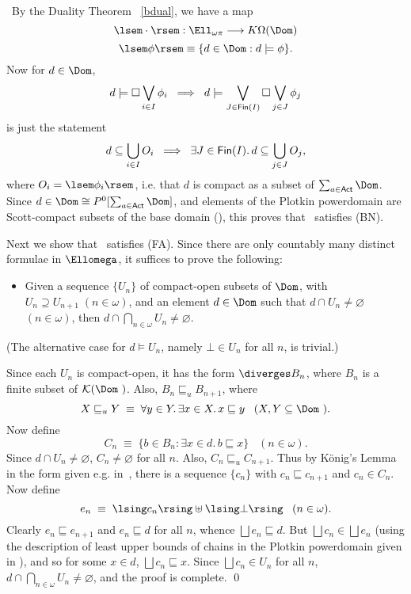 \proof\ By the Duality Theorem~ \ref{bdual}, we have a map
\[ \lsem \cdot \rsem : \Ell_{\omega \pi} \longrightarrow K \Omega (\Dom ) \]
\[ \lsem \phi \rsem  \equiv  \{ d \in \Dom : d \models \phi \} . \]
Now for $d \in \Dom$,
\[ d \models \Box \bigvee_{i \in I} \phi_{i}  \;\; \Longrightarrow \;\; d \models \bigvee_{J \in {\sf Fin}(I)} \Box \bigvee_{j \in J} \phi_{j}  \]
is just the statement
\[ d \subseteq \bigcup_{i \in I} O_{i} \;\; \Longrightarrow \;\; \exists J \in {\sf Fin}(I) . \, d \subseteq \bigcup_{j \in J} O_{j} , \]
where $O_{i} = \lsem \phi_{i} \rsem$, i.e. that $d$ is compact as a subset of $\sum_{a \in {\sf Act}} \Dom$.
Since $d \in \Dom \cong P^{0} [ \sum_{a \in {\sf Act}} \Dom ]$, and elements of the Plotkin powerdomain are Scott-compact subsets of the base domain (\cite{PloLN}), this proves that \Dom\ satisfies (BN).

Next we show that \Dom\ satisfies (FA).
Since there are only countably many distinct formulae in $\Ellomega$, it suffices to prove the following:
\begin{itemize}
\item Given a sequence $\{ U_{n} \}$ of compact-open subsets of $\Dom$, 
with $U_{n} \supseteq U_{n + 1} \; (n \in \omega )$, and an element $d \in \Dom$ such that $d \cap U_{n} \not= \varnothing$ $(n \in \omega)$, then $d \cap \bigcap_{n \in \omega} U_{n} \not= \varnothing$.
\end{itemize}
(The alternative case for $d \models U_{n}$, namely $\bot \in U_{n}$ for all $n$, is trivial.)

Since each $U_{n}$ is compact-open, it has the form $\diverges B_{n}$, where $B_{n}$ is a finite subset of ${\cal K}(\Dom\ )$.
Also, $B_{n} \sqsubseteq_{u} B_{n + 1}$, where
\[ X \sqsubseteq_{u} Y \; \equiv \; \forall y \in Y. \, \exists x \in X . \, x \sqsubseteq y \;\;\; (X, Y \subseteq \Dom\ ) . \]
Now define
\[ C_{n} \; \equiv \; \{ b \in B_{n} : \exists x \in d . \, b \sqsubseteq x \} \;\;\; (n \in \omega ) . \]
Since $d \cap U_{n} \not= \varnothing$, $C_{n} \not= \varnothing$ for all $n$.
Also, $C_{n} \sqsubseteq_{u} C_{n + 1}$.
Thus by K\"{o}nig's Lemma in the form given e.g. in~\cite{Niv81}, there is a sequence $\{ c_{n} \}$ with $c_{n} \sqsubseteq c_{n+1}$ and $c_{n} \in C_{n}$.
Now define
\[ e_{n} \; \equiv \; \lsing c_{n} \rsing \uplus \lsing \bot \rsing \;\;\; (n \in \omega ). \]
Clearly $e_{n} \sqsubseteq e_{n + 1}$ and $e_{n} \sqsubseteq d$ for all $n$, whence $\bigsqcup e_{n} \sqsubseteq d$.
But $\bigsqcup c_{n} \in \bigsqcup e_{n}$ (using the description of least 
upper bounds of chains in the Plotkin powerdomain given in \cite[Theorem 8]{Plo76}), 
and so for some $x \in d$, $\bigsqcup c_{n} \sqsubseteq x$.
Since $\bigsqcup c_{n} \in U_{n}$ for all $n$, $d \cap \bigcap_{n \in \omega} U_{n} \not= \varnothing$, and the proof is complete. \qed

